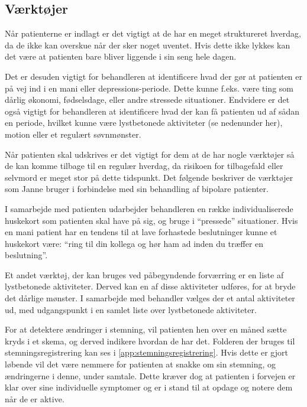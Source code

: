 \subsection{Værktøjer}
Når patienterne er indlagt er det vigtigt at de har en meget struktureret hverdag, da de ikke kan overskue når der sker noget uventet.
Hvis dette ikke lykkes kan det være at patienten bare bliver liggende i sin seng hele dagen.

Det er desuden vigtigt for behandleren at identificere hvad der gør at patienten er på vej ind i en mani eller depressions-periode.
Dette kunne f.eks. være ting som dårlig økonomi, fødselsdage, eller andre stressede situationer.
Endvidere er det også vigtigt for behandleren at identificere hvad der kan få patienten ud af sådan en periode, hvilket kunne være lystbetonede aktiviteter (se nedenunder her), motion eller et regulært søvnmønster.

Når patienten skal udskrives er det vigtigt for dem at de har nogle værktøjer så de kan komme tilbage til en regulær hverdag, da risikoen for tilbagefald eller selvmord er meget stor på dette tidspunkt. 
Det følgende beskriver de værktøjer som Janne bruger i forbindelse med sin behandling af bipolare patienter.
\begin{description}[style=nextline]
	\item[Huskekort] I samarbejde med patienten udarbejder behandleren en række individualiserede huskekort som patienten skal have på sig, og bruge i ``pressede'' situationer. 
	Hvis en mani patient har en tendens til at lave forhastede beslutninger kunne et huskekort være: ``ring til din kollega og hør ham ad inden du træffer en beslutning''.
	
	\item[Lystbetonede aktiviteter] Et andet værktøj, der kan bruges ved påbegyndende forværring er en liste af lystbetonede aktiviteter.
	Derved kan en af disse aktiviteter udføres, for at bryde det dårlige mønster.
	I samarbejde med behandler vælges der et antal aktiviteter ud, med udgangspunkt i en samlet liste over lystbetonede aktiviteter.
	
	\item[Stemningsregistrering] For at detektere ændringer i stemning, vil patienten hen over en måned sætte kryds i et skema, og derved indikere hvordan de har det.
	Folderen der bruges til stemningsregistrering kan ses i \cref{app:stemningsregistrering}.
	Hvis dette er gjort løbende vil det være nemmere for patienten at snakke om sin stemning, og ændringerne i denne, under samtale.
	Dette kræver dog at patienten i forvejen er klar over sine individuelle symptomer og er i stand til at opdage og notere dem når de er aktive.
\end{description}

